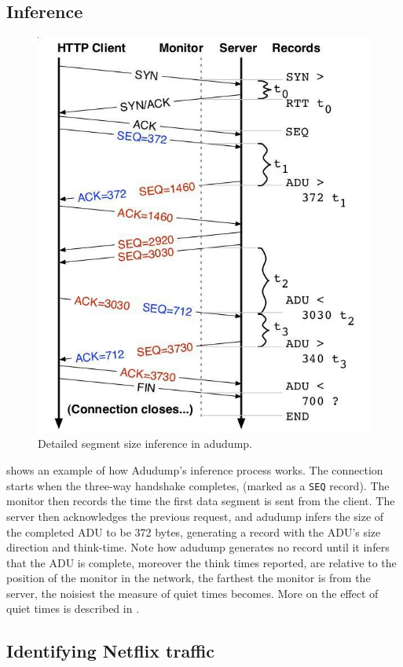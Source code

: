 \subsection{Inference}

\begin{figure}[!h]
  \centering
  \includegraphics[width=0.6\columnwidth]{img/adudump.png}
  \caption{Detailed segment size inference in adudump.}
  \label{fig:adudump}
\end{figure}

 shows an example of how Adudump's inference process works.
The connection starts when the three-way handshake completes, (marked as a
\texttt{SEQ} record). The monitor then records the time the first data segment
is sent from the client. The server then acknowledges the previous request, and
adudump infers the size of the completed ADU to be 372 bytes, generating a
record with the ADU's size direction and think-time. Note how adudump generates
no record until it infers that the ADU is complete, moreover the think times
reported, are relative to the position of the monitor in the network, the
farthest the monitor is from the server, the noisiest the measure of quiet
times becomes. More on the effect of quiet times is described in
.

\subsection{Identifying Netflix traffic}

